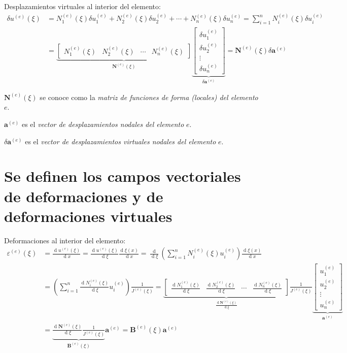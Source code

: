 \documentclass[12pt,letterpaper]{article}
\newcommand{\ve}[1]{{\boldsymbol{#1}}}
\newcommand{\ma}[1]{{\boldsymbol{#1}}}
\newcommand{\dd}{\operatorname{d} \!}
\begin{document}
Desplazamientos virtuales al interior del elemento:
\begin{align}
\delta u^{(e)}(\xi) 
&= N_1^{(e)}(\xi) \delta u_1^{(e)} + N_2^{(e)}(\xi) \delta u_2^{(e)} + \cdots + N_n^{(e)}(\xi) \delta u_n^{(e)} = \sum_{i=1}^n N_i^{(e)}(\xi) \delta u_i^{(e)} \\
&= 
\underbrace{\begin{bmatrix}
   N_1^{(e)}(\xi) & N_2^{(e)}(\xi) & \cdots & N_n^{(e)}(\xi)
   \end{bmatrix}}_{\ma{N}^{(e)}(\xi)}
\underbrace{\begin{bmatrix}
   \delta u_1^{(e)} \\ \delta u_2^{(e)} \\ \vdots \\ \delta u_n^{(e)} 
   \end{bmatrix}}_{\delta \ma{a}^{(e)}} = \ma{N}^{(e)}(\xi) \delta \ve{a}^{(e)}
\end{align}

$\ma{N}^{(e)}(\xi)$ se conoce como la \emph{matriz de funciones de forma (locales) del elemento} $e$.

$\ve{a}^{(e)}$ es el \emph{vector de desplazamientos nodales del elemento} $e$.

$\delta\ve{a}^{(e)}$ es el \emph{vector de desplazamientos virtuales nodales del elemento} $e$.

\newpage

\section{Se definen los campos vectoriales de deformaciones y  de deformaciones virtuales}

Deformaciones al interior del elemento:
\begin{align}
\varepsilon^{(e)}(\xi) &= \frac{\dd u^{(e)}(\xi)}{\dd x} =
 \frac{\dd u^{(e)}(\xi)}{\dd \xi}\frac{\dd \xi(x)}{\dd x} = \frac{\dd}{\dd \xi}\left(\sum_{i=1}^n N_i^{(e)}(\xi) u_i^{(e)}\right)\frac{\dd \xi(x)}{\dd x} \\
 &= \left(\sum_{i=1}^n \frac{\dd N_i^{(e)}(\xi)}{\dd \xi} u_i^{(e)}\right) \frac{1}{J^{(e)}(\xi)} = 
\underbrace{\begin{bmatrix}
  \frac{\dd N_1^{(e)}(\xi)}{\dd \xi} & \frac{\dd N_2^{(e)}(\xi)}{\dd \xi} & \cdots & \frac{\dd N_n^{(e)}(\xi)}{\dd \xi}
   \end{bmatrix}}_{\frac{\dd \ma{N}^{(e)}(\xi)}{\dd \xi}} \frac{1}{J^{(e)}(\xi)}
\underbrace{\begin{bmatrix}
   u_1^{(e)} \\ u_2^{(e)} \\ \vdots \\ u_n^{(e)}
   \end{bmatrix}}_{\ma{a}^{(e)}} \\
&= 
\underbrace{\frac{\dd \ma{N}^{(e)}(\xi)}{\dd \xi}%
    \frac{1}{J^{(e)}(\xi)}}_{\ma{B}^{(e)}(\xi)}
\ma{a}^{(e)} = \ma{B}^{(e)}(\xi)  \ve{a}^{(e)}
\end{align}
\end{document}
